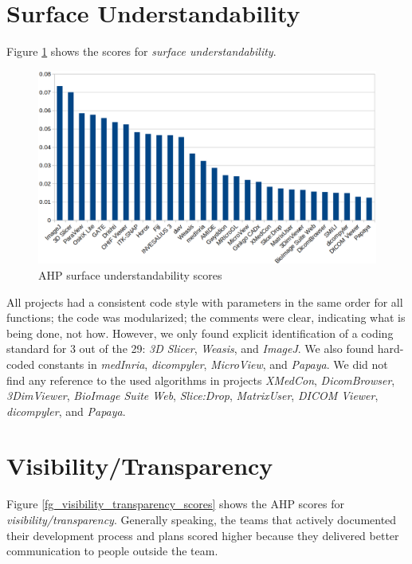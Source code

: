 \section{Surface Understandability}
Figure \ref{fg_surface_understandability_scores} shows the scores for \textit{surface understandability}.

\begin{figure}[H]
\includegraphics[scale=0.38]{figures/understandability_scores.png}
\caption{AHP surface understandability scores}
\label{fg_surface_understandability_scores}
\end{figure}

All projects had a consistent code style with parameters in the same order for all functions; the code was modularized; the comments were clear, indicating what is being done, not how. However, we only found explicit identification of a coding standard for 3 out of the 29: \textit{3D Slicer}, \textit{Weasis}, and \textit{ImageJ}. We also found hard-coded constants in \textit{medInria}, \textit{dicompyler}, \textit{MicroView}, and \textit{Papaya}. We did not find any reference to the used algorithms in projects \textit{XMedCon}, \textit{DicomBrowser}, \textit{3DimViewer}, \textit{BioImage Suite Web}, \textit{Slice:Drop}, \textit{MatrixUser}, \textit{DICOM Viewer}, \textit{dicompyler}, and \textit{Papaya}. 

\section{Visibility/Transparency}
Figure \ref{fg_visibility_transparency_scores} shows the AHP scores for \textit{visibility/transparency}. Generally speaking, the teams that actively documented their development process and plans scored higher because they delivered better communication to people outside the team.

